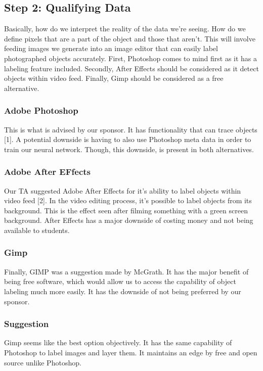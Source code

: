 \documentclass[10pt,journal,compsoc, draftclsnofoot,onecolumn]{IEEEtran}
\begin{document}
\subsection{Step 2: Qualifying Data}
Basically, how do we interpret the reality of the data we're seeing.
How do we define pixels that are a part of the object and those that aren't.
This will involve feeding images we generate into an image editor that can easily label photographed objects accurately.
First, Photoshop comes to mind first as it has a labeling feature included.
Secondly, After Effects should be considered as it detect objects within video feed.
Finally, Gimp should be considered as a free alternative.

\subsubsection{Adobe Photoshop}
This is what is advised by our sponsor. It has functionality that can trace objects [1].
A potential downside is having to also use Photoshop meta data in order to train our neural network.
Though, this downside, is present in both alternatives.

\subsubsection{Adobe After EFfects}
Our TA suggested Adobe After Effects for it's ability to label objects within video feed [2].
In the video editing process, it's possible to label objects from its background.
This is the effect seen after filming something with a green screen background.
After Effects has a major downside of costing money and not being available to students.

\subsubsection{Gimp}
Finally, GIMP was a suggestion made by McGrath.
It has the major benefit of being free software, which would allow us to access the capability of object labeling much more easily.
It has the downside of not being preferred by our sponsor.

\subsubsection{Suggestion}
Gimp seems like the best option objectively.
It has the same capability of Photoshop to label images and layer them.
It maintains an edge by free and open source unlike Photoshop.
\end{document}
